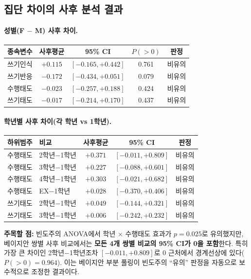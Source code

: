 \documentclass[11pt]{article}
\begin{document}
\subsection{집단 차이의 사후 분석 결과}

\paragraph{성별(F $-$ M) 사후 차이.}
\begin{table}[h]
\centering
\begin{tabular}{lcccc}
\toprule
종속변수 & 사후평균 & 95\% CI & $P(>0)$ & 판정 \\
\midrule
쓰기인식 & $+0.115$ & $[-0.165, +0.442]$ & 0.761 & 비유의 \\
쓰기반응 & $-0.172$ & $[-0.434, +0.051]$ & 0.079 & 비유의 \\
수행태도 & $-0.023$ & $[-0.257, +0.188]$ & 0.424 & 비유의 \\
쓰기태도 & $-0.017$ & $[-0.214, +0.170]$ & 0.437 & 비유의 \\
\bottomrule
\end{tabular}
\end{table}

\paragraph{학년별 사후 차이(각 학년 vs 1학년).}
\begin{table}[h]
\centering
\begin{tabular}{llccc}
\toprule
하위범주 & 비교 & 사후평균 & 95\% CI & 판정 \\
\midrule
수행태도 & 2학년$-$1학년 & $+0.371$ & $[-0.011, +0.809]$ & 비유의 \\
수행태도 & 3학년$-$1학년 & $+0.227$ & $[-0.088, +0.601]$ & 비유의 \\
수행태도 & 4학년$-$1학년 & $+0.303$ & $[-0.021, +0.682]$ & 비유의 \\
수행태도 & EX$-$1학년 & $+0.028$ & $[-0.370, +0.406]$ & 비유의 \\
쓰기태도 & 2학년$-$1학년 & $+0.049$ & $[-0.144, +0.321]$ & 비유의 \\
쓰기태도 & 3학년$-$1학년 & $+0.006$ & $[-0.242, +0.232]$ & 비유의 \\
\bottomrule
\end{tabular}
\end{table}

\textbf{주목할 점:} 빈도주의 ANOVA에서 학년 $\times$ 수행태도 효과가 $p=0.025$로 유의했지만, 베이지안 쌍별 사후 비교에서는 \textbf{모든 4개 쌍별 비교의 95\% CI가 0을 포함}한다. 특히 가장 큰 차이인 2학년$-$1학년조차 $[-0.011, +0.809]$로 0 근처에서 경계선상에 있다($P(>0)=0.964$). 이는 베이지안 부분 풀링이 빈도주의 ``유의'' 판정을 자동으로 보수적으로 조정한 결과이다.
\end{document}
